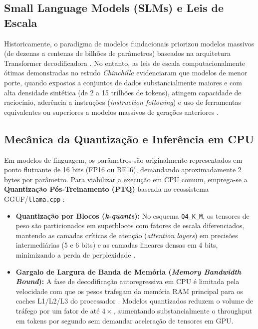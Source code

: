 \documentclass[11pt]{article}
\begin{document}
\subsection{Small Language Models (SLMs) e Leis de Escala}
Historicamente, o paradigma de modelos fundacionais priorizou modelos massivos (de dezenas a centenas de bilhões de parâmetros) baseados na arquitetura Transformer decodificadora \citep{vaswani2017attention}. No entanto, as leis de escala computacionalmente ótimas demonstradas no estudo \textit{Chinchilla} \citep{hoffmann2022training} evidenciaram que modelos de menor porte, quando expostos a conjuntos de dados substancialmente maiores e com alta densidade sintética (de 2 a 15 trilhões de tokens), atingem capacidade de raciocínio, aderência a instruções (\textit{instruction following}) e uso de ferramentas equivalentes ou superiores a modelos massivos de gerações anteriores \citep{allal2024smollm2, yang2024qwen25}.

\subsection{Mecânica da Quantização e Inferência em CPU}
Em modelos de linguagem, os parâmetros são originalmente representados em ponto flutuante de 16 bits (FP16 ou BF16), demandando aproximadamente 2 bytes por parâmetro. Para viabilizar a execução em CPU comum, emprega-se a \textbf{Quantização Pós-Treinamento (PTQ)} baseada no ecossistema GGUF/\texttt{llama.cpp} \citep{gerganov2023llamacpp}:
\begin{itemize}
    \item \textbf{Quantização por Blocos (\textit{k-quants}):} No esquema \texttt{Q4\_K\_M}, os tensores de peso são particionados em superblocos com fatores de escala diferenciados, mantendo as camadas críticas de atenção (\textit{attention layers}) em precisões intermediárias (5 e 6 bits) e as camadas lineares densas em 4 bits, minimizando a perda de perplexidade \citep{dettmers2022llmint8}.
    \item \textbf{Gargalo de Largura de Banda de Memória (\textit{Memory Bandwidth Bound}):} A fase de decodificação autoregressiva em CPU é limitada pela velocidade com que os pesos trafegam da memória RAM principal para os caches L1/L2/L3 do processador \citep{kim2023memory}. Modelos quantizados reduzem o volume de tráfego por um fator de até $4\times$, aumentando substancialmente o throughput em tokens por segundo sem demandar aceleração de tensores em GPU.
\end{itemize}
\end{document}
